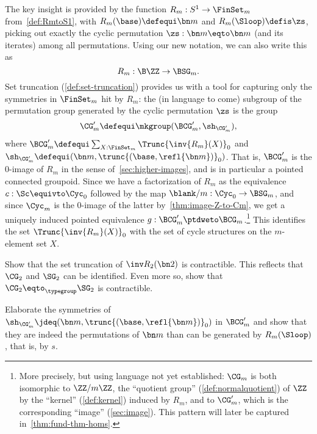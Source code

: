 \begin{example}
The key insight is provided by the function $R_m:S^1\to\FinSet_m$ from~\cref{def:RmtoS1},
with $R_m(\base)\defequi\bn m$ and
$R_m(\Sloop)\defis \zs$, picking out exactly the cyclic permutation
$\zs:\bn m\eqto \bn m$ (and its iterates) among all permutations.
Using our new notation, we can also write this as
\[
  R_m : \B\ZZ \to \BSG_m.
\]
Set truncation (\cref{def:set-truncation}) provides us with a tool for capturing only the symmetries in $\FinSet_m$ hit by $R_m$:
the (in language to come) subgroup of the permutation group generated by the cyclic permutation $\zs$ is the group
\[
  \CG'_m\defequi\mkgroup(\BCG'_m,\sh_{\CG'_m}),
\]
where $\BCG'_m\defequi \sum_{X:\FinSet_m}\Trunc{\inv{R_m}(X)}_0$
and $\sh_{\CG'_m}\defequi (\bn m,\trunc{(\base,\refl{\bn m})}_0)$.
That is, $\BCG'_m$ is the $0$-image of $R_m$ in the sense 
of~\cref{sec:higher-images},
and is in particular a pointed connected groupoid.
Since we have a factorization of $R_m$ as the equivalence $c:\Sc\equivto\Cyc_0$
followed by the map $\blank/m:\Cyc_0 \to \BSG_m$,
and since $\Cyc_m$ is the $0$-image of the latter by~\cref{thm:image-Z-to-Cm},
we get a uniquely induced pointed equivalence $g : \BCG'_m \ptdweto \BCG_m$.\footnote{%
  More precisely, but using language not yet established: $\CG_m$ is both isomorphic to $\ZZ/m\ZZ$, the ``quotient group'' (\cf \cref{def:normalquotient}) of $\ZZ$ by the ``kernel'' (\cf \cref{def:kernel}) induced by $R_m$, and to $\CG'_m$, which is the corresponding ``image'' (\cf \cref{sec:image}). This pattern will later be captured in~\cref{thm:fund-thm-homs}.}
This identifies the set $\Trunc{\inv{R_m}(X)}_0$ with the set of 
cycle structures on the $m$-element set $X$.
\end{example}

\begin{xca}\label{xca:CG2isSG2}
Show that the set truncation of $\inv R_2(\bn 2)$ is contractible.
This reflects that $\CG_2$ and $\SG_2$ can be identified.
Even more so, show that $\CG_2\eqto_\typegroup\SG_2$ is contractible.
\end{xca}
\begin{xca}\label{xca:RmloopCGm}
Elaborate the symmetries of
$\sh_{\CG'_m}\jdeq (\bn m,\trunc{(\base,\refl{\bn m})}_0)$
in $\BCG'_m$ and show that they are indeed the permutations of $\bn m$
than can be generated by $R_m(\Sloop)$, that is, by $s$. 
\end{xca}

